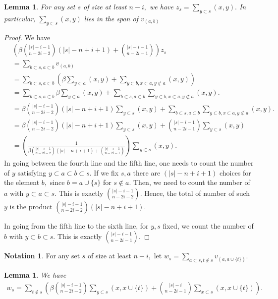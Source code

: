 \documentclass[10 pt]{amsart}
\theoremstyle{plain}
\newtheorem{lem}[thm]{Lemma}
\theoremstyle{definition}
\newtheorem{note}[thm]{Notation}
\theoremstyle{remark}
\numberwithin{equation}{section}
\begin{document}
\begin{lem}
\label{z_equivalence}
For any set $s$ of size at least $n-i,$ we have $z_s = \sum_{y \subset s}^{}(x, y).$ In particular, $\sum_{y \subset s}^{}(x, y)$ lies in the span of $v_{(a, b)}$
\end{lem}
\begin{proof}
We have 
\begin{align*}
	&\left(\beta\binom {|s|-i-1}{n-2i-2}(|s|-n+i+1)+\binom{|s|-i-1}{n-2i-1}\right) z_s \\
	&= \sum_{b\subset s,a \subset b}^{}v_{(a, b)}\\
	&=\sum_{b\subset s,a \subset b}^{} \left(\beta \sum_{y \subset a}^{}(x, y) + \sum_{y\subset b,x \subset a,y\not\subset a}^{}(x, y)\right)\\
	&= \sum_{b\subset s,a \subset b}^{} \beta \sum_{y \subset a}^{}(x, y) + \sum_{b\subset s,a \subset b}^{} \sum_{y\subset b,x \subset a,y\not\subset a}^{}(x, y).\\
	&= \beta\binom {|s|-i-1}{n-2i-2}(|s|-n+i+1) \sum_{y \subset s}^{}(x ,y)+ \sum_{b\subset s,a \subset b}^{} \sum_{y\subset b,x \subset a,y\not\subset a}^{}(x, y).\\
	&= \beta\binom {|s|-i-1}{n-2i-2}(|s|-n+i+1) \sum_{y \subset s}^{}(x ,y) + \binom{|s|-i-1}{n-2i-1}\sum_{y\subset s}^{}(x, y)\\
	& =\left(\frac{1}{\beta\binom {|s|-i-1}{n-2i-2}(|s|-n+i+1)+\binom{|s|-i-1}{n-2i-1}}\right) \sum_{y \subset s}^{}(x,y).
\end{align*}
In going between the fourth line and the fifth line, one needs to count the number of $y$ satisfying $y \subset a \subset b\subset s.$ If we fix $s,a$ there are $(|s|-n+i+1)$ choices for the element $b,$ since $b = a \cup \{s\}$ for $s \notin a.$ Then, we need to count the number of $a$ with $y \subset a \subset s.$ This is exactly $\binom {|s|-i-1}{n-2i-2}.$ Hence, the total of number of such $y$ is the product $\binom {|s|-i-1}{n-2i-2}(|s|-n+i+1).$

In going from the fifth line to the sixth line, for $y,s$ fixed, we count the number of $b$ with $y \subset b \subset s.$ This is exactly $\binom{|s|-i-1}{n-2i-1}$.
\end{proof}

\begin{note}
For any set $s$ of size at least $n-i,$ let $w_s = \sum_{a \subset s,t\notin s}^{}v_{(a, a \cup \{t\})}.$
\end{note}

\begin{lem}
\label{w_equivalence}
We have 
\begin{align*}
	w_s = \sum_{t\notin s}^{} \left(\beta \binom {|s|-i-1}{n-2i-2}	\sum_{y \subset s}^{}(x, x \cup \{t\})  + \binom {|s|-i}{n-2i-1} \sum_{x \subset s}^{}(x ,x \cup \{t\}) \right).
\end{align*}
\end{lem}
\end{document}
